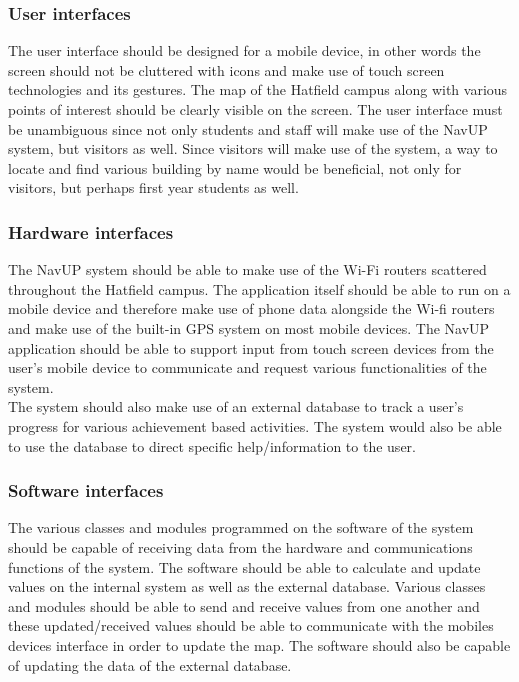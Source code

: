 \documentclass[a4paper,12pt]{article}
\begin{document}
\subsubsection{User interfaces}
The user interface should be designed for a mobile device, in other words the screen should not be cluttered with icons and make use of touch screen technologies and its gestures. The map of the Hatfield campus along with various points of interest should be clearly visible on the screen. The user interface must be unambiguous since not only students and staff will make use of the NavUP system, but visitors as well. Since visitors will make use of the system, a way to locate and find various building by name would be beneficial, not only for visitors, but perhaps first year students as well.\\
\subsubsection{Hardware interfaces}
The NavUP system should be able to make use of the Wi-Fi routers scattered throughout the Hatfield campus. The application itself should be able to run on a mobile device and therefore make use of phone data alongside the Wi-fi routers and make use of the built-in GPS system on most mobile devices. The NavUP application should be able to support input from touch screen devices from the user’s mobile device to communicate and request various functionalities of the system.\\
The system should also make use of an external database to track a user’s progress for various achievement based activities. The system would also be able to use the database to direct specific help/information to the user.\\
\subsubsection{Software interfaces}
The various classes and modules programmed on the software of the system should be capable of receiving data from the hardware and communications functions of the system. The software should be able to calculate and update values on the internal system as well as the external database. Various classes and modules should be able to send and receive values from one another and these updated/received values should be able to communicate with the mobiles devices interface in order to update the map. The software should also be capable of updating the data of the external database.\\
\end{document}
